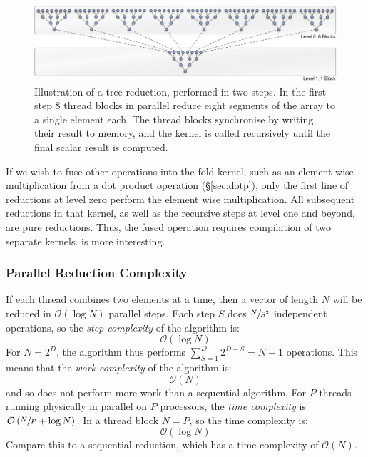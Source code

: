 \begin{figure}[htbp]
    \begin{center}
        \includegraphics[width=\textwidth]{images/sec-4/tree-reduction}
    \end{center}
    \caption[A parallel tree reduction]{Illustration of a tree reduction,
        performed in two steps. In the first step 8 thread blocks in parallel
        reduce eight segments of the array to a single element each. The thread
        blocks synchronise by writing their result to memory, and the kernel is
    called recursively until the final scalar result is computed.}
    \label{fig:tree_reduction}
\end{figure}

If we wish to fuse other operations into the fold kernel, such as an element
wise multiplication from a dot product operation (\S\ref{sec:dotp}), only the
first line of reductions at level zero perform the element wise multiplication.
All subsequent reductions in that kernel, as well as the recursive steps at
level one and beyond, are pure reductions. Thus, the fused operation requires
compilation of two separate kernels. %
is more interesting.

\subsubsection{Parallel Reduction Complexity}
\label{sec:parallel_reduction_complexity}

If each thread combines two elements at a time, then a vector of length $N$ will
be reduced in $\mathcal{O}\left( \log N \right)$ parallel steps. Each step $S$
does $\sfrac{N}{S^2}$ independent operations, so the \emph{step
complexity} of the algorithm is:
\[
\mathcal{O}\left( \log N \right)
\]
For $N=2^{D}$, the algorithm thus performs $\sum_{S=1}^{D}2^{D-S} = N - 1$
operations. This means that the \emph{work complexity} of
the algorithm is:
\[
\mathcal{O}\left( N \right)
\]
and so does not perform more work than a sequential algorithm. For $P$ threads
running physically in parallel on $P$ processors, the \emph{time
complexity} is $\mathcal{O}\left( \sfrac{N}{P} + \log N
\right)$. In a thread block $N = P$, so the time complexity is:
\[
\mathcal{O}\left( \log N \right)
\]
Compare this to a sequential reduction, which has a time complexity of
$\mathcal{O}\left( N \right)$.

